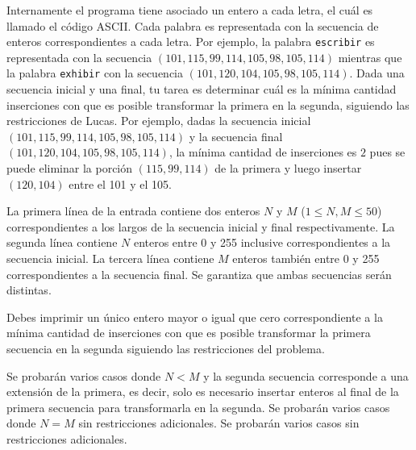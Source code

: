 \documentclass{oci}
\begin{document}
\begin{problemDescription}
  Internamente el programa tiene asociado un entero a cada letra, el cuál es
  llamado el código ASCII.\@
  Cada palabra es representada con la secuencia de enteros correspondientes a
  cada letra.
  Por ejemplo, la palabra \texttt{escribir} es representada con la secuencia
  $(101,115,99,114,105,98,105,114)$ mientras que la palabra \texttt{exhibir} con
  la secuencia $(101,120,104,105,98,105,114)$.
  Dada una secuencia inicial y una final, tu tarea es determinar cuál es la
  mínima cantidad inserciones con que es posible transformar la primera en la
  segunda, siguiendo las restricciones de Lucas.
  Por ejemplo, dadas la secuencia inicial $(101,115,99,114,105,98,105,114)$ y la
  secuencia final $(101,120,104,105,98,105,114)$, la mínima cantidad de
  inserciones es $2$ pues se puede eliminar la porción $(115,99,114)$ de la
  primera y luego insertar $(120,104)$ entre el 101 y el 105.
\end{problemDescription}

\begin{inputDescription}
  La primera línea de la entrada contiene dos enteros $N$ y $M$ ($1\leq N,M \leq 50$)
  correspondientes a los largos de la secuencia inicial y final respectivamente.
  La segunda línea contiene $N$ enteros entre 0 y 255 inclusive correspondientes
  a la secuencia inicial.
  La tercera línea contiene $M$ enteros también entre 0 y 255 correspondientes
  a la secuencia final.
  Se garantiza que ambas secuencias serán distintas.
\end{inputDescription}

\begin{outputDescription}
  Debes imprimir un único entero mayor o igual que cero correspondiente a la
  mínima cantidad de inserciones con que es posible transformar la primera
  secuencia en la segunda siguiendo las restricciones del problema.
\end{outputDescription}

\begin{scoreDescription}
   Se probarán varios casos donde $N < M$ y la segunda secuencia
  corresponde a una extensión de la primera, es decir, solo es necesario
  insertar enteros al final de la primera secuencia para transformarla en la
  segunda.
   Se probarán varios casos donde $N=M$ sin restricciones adicionales.
   Se probarán varios casos sin restricciones adicionales.
\end{scoreDescription}

\begin{sampleDescription}
\end{sampleDescription}
\end{document}
